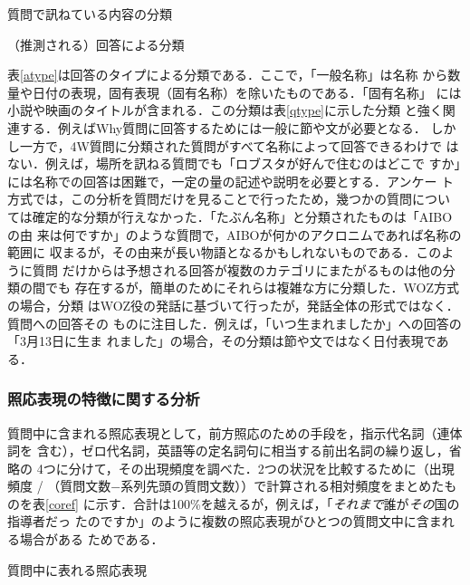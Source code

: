 \documentclass[japanese]{jnlp_1.4}
\begin{document}
\begin{table}[b]
\caption{質問で訊ねている内容の分類}
\label{qtype}

\end{table}
\begin{table}[b]
\caption{（推測される）回答による分類}
\label{atype}

\end{table}

表\ref{atype}は回答のタイプによる分類である．ここで，「一般名称」は名称
から数量や日付の表現，固有表現（固有名称）を除いたものである．「固有名称」
には小説や映画のタイトルが含まれる．この分類は表\ref{qtype}に示した分類
と強く関連する．例えばWhy質問に回答するためには一般に節や文が必要となる．
しかし一方で，4W質問に分類された質問がすべて名称によって回答できるわけで
はない．例えば，場所を訊ねる質問でも「ロブスタが好んで住むのはどこで
すか」には名称での回答は困難で，一定の量の記述や説明を必要とする．アンケー
ト方式では，この分析を質問だけを見ることで行ったため，幾つかの質問につい
ては確定的な分類が行えなかった．「たぶん名称」と分類されたものは「AIBOの由
来は何ですか」のような質問で，AIBOが何かのアクロニムであれば名称の範囲に
収まるが，その由来が長い物語となるかもしれないものである．このように質問
だけからは予想される回答が複数のカテゴリにまたがるものは他の分類の間でも
存在するが，簡単のためにそれらは複雑な方に分類した．WOZ方式の場合，分類
はWOZ役の発話に基づいて行ったが，発話全体の形式ではなく．質問への回答その
ものに注目した．例えば，「いつ生まれましたか」への回答の「3月13日に生ま
れました」の場合，その分類は節や文ではなく日付表現である．



\subsubsection{照応表現の特徴に関する分析}

質問中に含まれる照応表現として，前方照応のための手段を，指示代名詞（連体詞を
含む），ゼロ代名詞，英語等の定名詞句に相当する前出名詞の繰り返し，省略の
4つに分けて，その出現頻度を調べた．2つの状況を比較するために（出現頻度 / （質問文数−系列先頭の質問文数））で計算される相対頻度をまとめたものを表\ref{coref}
に示す．合計は100\%を越えるが，例えば，「{\em それまで}誰が{\em その}国の指導者だっ
たのですか」のように複数の照応表現がひとつの質問文中に含まれる場合がある
ためである．

\begin{table}[b]
\caption{質問中に表れる照応表現}
\label{coref}

\end{table}
\end{document}
